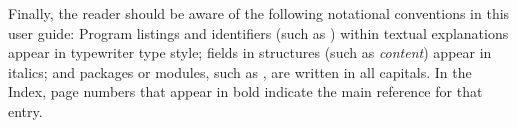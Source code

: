 Finally, the reader should be aware of the following notational conventions
in this user guide:  Program listings and identifiers (such as ) 
within textual explanations appear in typewriter type style; 
fields in {\C} structures (such as {\em content}) appear in italics;
and packages or modules, such as {\cvdense}, are written in all capitals. 
In the Index, page numbers that appear in bold indicate the main reference
for that entry.